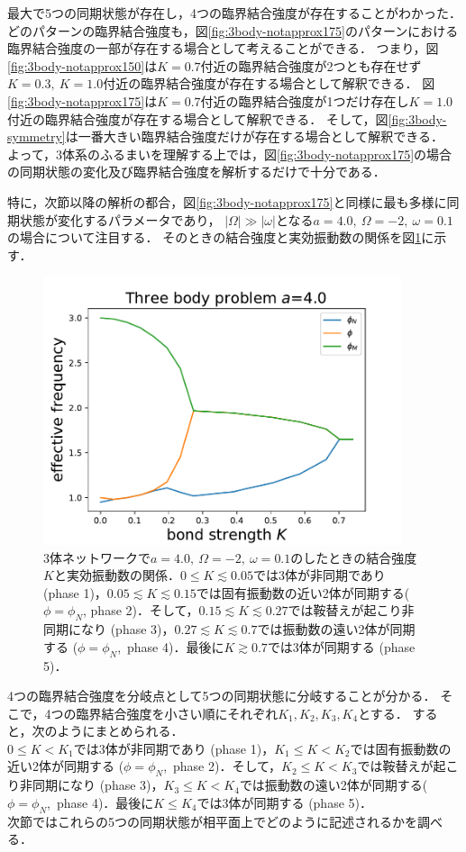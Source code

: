 \documentclass[../main]{subfiles}
\begin{document}
最大で5つの同期状態が存在し，4つの臨界結合強度が存在することがわかった．
どのパターンの臨界結合強度も，図\ref{fig:3body-notapprox175}のパターンにおける臨界結合強度の一部が存在する場合として考えることができる．
つまり，図\ref{fig:3body-notapprox150}は$K=0.7$付近の臨界結合強度が2つとも存在せず$K=0.3,\ K=1.0$付近の臨界結合強度が存在する場合として解釈できる．
図\ref{fig:3body-notapprox175}は$K=0.7$付近の臨界結合強度が1つだけ存在し$K=1.0$付近の臨界結合強度が存在する場合として解釈できる．
そして，図\ref{fig:3body-symmetry}は一番大きい臨界結合強度だけが存在する場合として解釈できる．\\
よって，3体系のふるまいを理解する上では，図\ref{fig:3body-notapprox175}の場合の同期状態の変化及び臨界結合強度を解析するだけで十分である．

特に，次節以降の解析の都合，図\ref{fig:3body-notapprox175}と同様に最も多様に同期状態が変化するパラメータであり，
$|\Omega|\gg|\omega|$となる$a=4.0,\ \Omega=-2,\ \omega=0.1$の場合について注目する．
そのときの結合強度と実効振動数の関係を図\ref{fig:3body-state}に示す．
\begin{figure}[t]
\centering
\includegraphics[width=105mm]{./images/three-body-prob.pdf}
\centering
\caption{3体ネットワークで$a=4.0,\ \Omega=-2,\ \omega=0.1$のしたときの結合強度$K$と実効振動数の関係．$0\leq K\lesssim 0.05$では3体が非同期であり (phase 1)，$0.05\lesssim K\lesssim 0.15$では固有振動数の近い2体が同期する($\phi=\phi_N$, phase 2)．そして，$0.15 \lesssim K\lesssim 0.27$では鞍替えが起こり非同期になり (phase 3)，$0.27\lesssim K\lesssim 0.7$では振動数の遠い2体が同期する ($\phi=\phi_N$,\ phase 4)．最後に$K\gtrsim 0.7$では3体が同期する (phase 5)．}
\label{fig:3body-state}
\end{figure}
4つの臨界結合強度を分岐点として5つの同期状態に分岐することが分かる．
そこで，4つの臨界結合強度を小さい順にそれぞれ$K_1,K_2,K_3,K_4$とする．
すると，次のようにまとめられる．\\
$0\leq K<K_1$では3体が非同期であり (phase 1)，$K_1\leq K<K_2$では固有振動数の近い2体が同期する ($\phi=\phi_N$,\ phase 2)．そして，$K_2\leq K<K_3$では鞍替えが起こり非同期になり (phase 3)，$K_3\leq K<K_4$では振動数の遠い2体が同期する($\phi=\phi_N$,\ phase 4)．最後に$K\leq K_4$では3体が同期する (phase 5)．\\
次節ではこれらの5つの同期状態が相平面上でどのように記述されるかを調べる．
\end{document}
